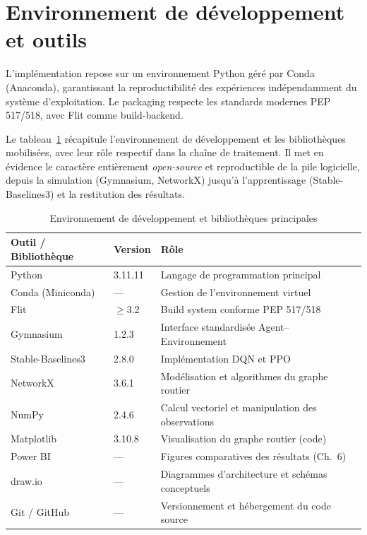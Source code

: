 \documentclass[11pt,a4paper]{report}
\begin{document}
\section{Environnement de développement et outils}
\label{sec:outils}

L'implémentation repose sur un environnement Python géré par Conda (Anaconda), garantissant la reproductibilité des expériences indépendamment du système d'exploitation. Le packaging respecte les standards modernes PEP 517/518, avec Flit comme build-backend.

Le tableau~\ref{tab:outils} r\'ecapitule l'environnement de d\'eveloppement et les biblioth\`eques mobilis\'ees, avec leur r\^ole respectif dans la cha\^ine de traitement. Il met en \'evidence le caract\`ere enti\`erement \emph{open-source} et reproductible de la pile logicielle, depuis la simulation (Gymnasium, NetworkX) jusqu'\`a l'apprentissage (Stable-Baselines3) et la restitution des r\'esultats.

\begin{table}[H]
\centering
\caption{Environnement de développement et bibliothèques principales}
\label{tab:outils}
\begin{tabular}{llll}
\toprule
\textbf{Outil / Bibliothèque} & \textbf{Version} & \textbf{Rôle} \\
\midrule
Python            & 3.11.11   & Langage de programmation principal \\
Conda (Miniconda) & —         & Gestion de l'environnement virtuel \\
Flit              & $\geq$3.2 & Build system conforme PEP 517/518 \\
Gymnasium         & 1.2.3     & Interface standardisée Agent--Environnement \\
Stable-Baselines3 & 2.8.0     & Implémentation DQN et PPO \\
NetworkX          & 3.6.1     & Modélisation et algorithmes du graphe routier \\
NumPy             & 2.4.6     & Calcul vectoriel et manipulation des observations \\
Matplotlib        & 3.10.8    & Visualisation du graphe routier (code) \\
Power BI          & —         & Figures comparatives des résultats (Ch.~6) \\
draw.io           & —         & Diagrammes d'architecture et schémas conceptuels \\
Git / GitHub      & —         & Versionnement et hébergement du code source \\
\bottomrule
\end{tabular}
\end{table}
\end{document}
